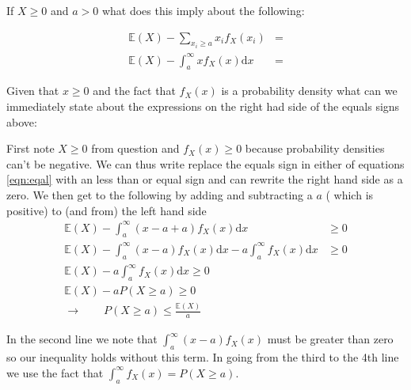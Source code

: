 \documentclass[paper=a4, fontsize=11pt]{scrartcl}
\newcommand{\red}[1]{{\color{red}#1}}
\numberwithin{equation}{section}
\numberwithin{figure}{section}
\numberwithin{table}{section}
\begin{document}
\noindent If $X \ge 0$ and $a > 0$ what does this imply about the following:

\begin{equation}
\begin{aligned}
 \mathbb{E}(X) - \sum_{x_i \ge a} x_i f_X(x_i) &= \\
 \mathbb{E}(X) - \int_a^{\infty} x f_X(x) \textrm{d}x &= 
 \end{aligned}
 \label{eqn:eqal}
 \end{equation}


\noindent Given that $x \ge 0$ and the fact that $f_X(x)$ is a probability
density what can we immediately state about the expressions on the right had
side of the equals signs above: 

\begin{questions}
\vspace{9cm}
\end{questions}

\begin{answers}
\red{
\vspace{0.25cm}
First note $X\ge 0$ from question and $f_X(x) \ge 0$ because probability
densities can't be negative. 
We can thus write replace the equals sign in either of equations \ref{eqn:eqal}
with an less than or equal sign and
can rewrite the right hand side as a zero.  We then get to the following by
adding and subtracting a $a$ ( which is positive) to (and from) the left hand
side
\begin{equation}
\begin{aligned}
\mathbb{E}(X) - \int_a^\infty ( x - a + a ) f_X(x) \textrm{d}x & \ge 0  \\
\mathbb{E}(X) - \int_a^\infty ( x - a ) f_X(x)  \textrm{d}x  - a \int_a^\infty
f_X(x) \textrm{d}x & \ge 0 \\ 
\mathbb{E}(X) - a \int_a^\infty f_X(x) \textrm{d}x \ge 0 \\
\mathbb{E}(X) - a P(X \ge a ) \ge 0 \\
\rightarrow \qquad P(X\ge a ) \le \frac{\mathbb{E}(X)}{a}
\end{aligned}
\end{equation}

In the second line we note that $\int_a^\infty ( x - a ) f_X(x)$ must be greater
than zero so
our inequality holds without this term.  In going from the third to the 4th line
we use the fact that 
$\int_a^\infty f_X(x) = P(X\ge a )$. 
}
\vspace{0.25cm}
\end{answers}
\end{document}
